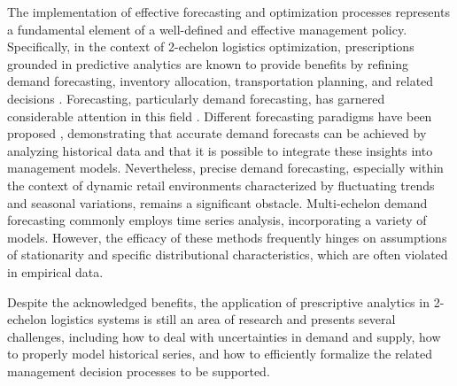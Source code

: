\documentclass[ijoc,sglanonrev]{informs4}
\begin{document}
The implementation of effective forecasting and optimization processes represents a fundamental element of a well-defined and effective management policy. Specifically, in the context of 2-echelon logistics optimization, prescriptions grounded in predictive analytics are known to provide benefits by refining demand forecasting, inventory allocation, transportation planning, and related decisions \citep{VAD12,KK10,A01}. Forecasting, particularly demand forecasting, has garnered considerable attention in this field \citep{Shenstone01}. Different forecasting paradigms have been proposed \citep{Syntetos05,Keneley02,Ma15}, demonstrating that accurate demand forecasts can be achieved by analyzing historical data and that it is possible to integrate these insights into management models. Nevertheless, precise demand forecasting, especially within the context of dynamic retail environments characterized by fluctuating trends and seasonal variations, remains a significant obstacle. Multi-echelon demand forecasting commonly employs time series analysis, incorporating a variety of models.  However, the efficacy of these methods frequently hinges on assumptions of stationarity and specific distributional characteristics, which are often violated in empirical data. 

Despite the acknowledged benefits, the application of prescriptive analytics in 2-echelon logistics systems is still an area of research and presents several challenges, including how to deal with uncertainties in demand and supply, how to properly model historical series, and how to efficiently formalize the related management decision processes to be supported. 



\end{document}
